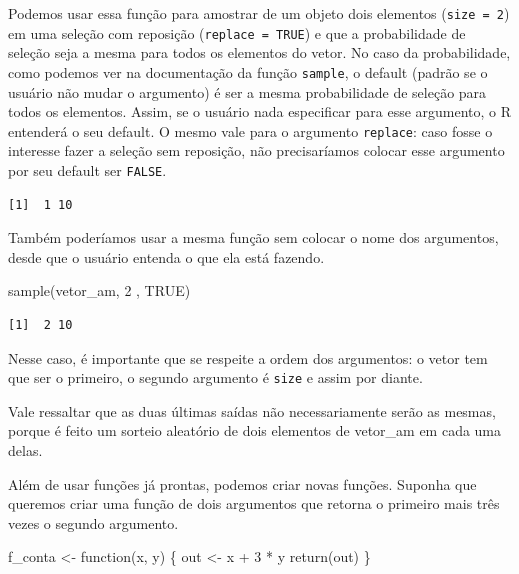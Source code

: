 \documentclass[
  letterpaper,
  DIV=11,
  numbers=noendperiod]{scrreprt}
\newenvironment{Shaded}{\begin{snugshade}}{\end{snugshade}}
\newcommand{\ConstantTok}[1]{\textcolor[rgb]{0.56,0.35,0.01}{#1}}
\newcommand{\ControlFlowTok}[1]{\textcolor[rgb]{0.00,0.23,0.31}{#1}}
\newcommand{\DecValTok}[1]{\textcolor[rgb]{0.68,0.00,0.00}{#1}}
\newcommand{\FunctionTok}[1]{\textcolor[rgb]{0.28,0.35,0.67}{#1}}
\newcommand{\NormalTok}[1]{\textcolor[rgb]{0.00,0.23,0.31}{#1}}
\newcommand{\OtherTok}[1]{\textcolor[rgb]{0.00,0.23,0.31}{#1}}
\newcommand{\SpecialCharTok}[1]{\textcolor[rgb]{0.37,0.37,0.37}{#1}}
\begin{document}
Podemos usar essa função para amostrar de um objeto dois elementos
(\texttt{size\ =\ 2}) em uma seleção com reposição
(\texttt{replace\ =\ TRUE}) e que a probabilidade de seleção seja a
mesma para todos os elementos do vetor. No caso da probabilidade, como
podemos ver na documentação da função \texttt{sample}, o default (padrão
se o usuário não mudar o argumento) é ser a mesma probabilidade de
seleção para todos os elementos. Assim, se o usuário nada especificar
para esse argumento, o R entenderá o seu default. O mesmo vale para o
argumento \texttt{replace}: caso fosse o interesse fazer a seleção sem
reposição, não precisaríamos colocar esse argumento por seu default ser
\texttt{FALSE}.

\begin{verbatim}
[1]  1 10
\end{verbatim}

Também poderíamos usar a mesma função sem colocar o nome dos argumentos,
desde que o usuário entenda o que ela está fazendo.

\begin{Shaded}
\begin{Highlighting}[]
\FunctionTok{sample}\NormalTok{(vetor\_am, }\DecValTok{2}\NormalTok{ , }\ConstantTok{TRUE}\NormalTok{) }
\end{Highlighting}
\end{Shaded}

\begin{verbatim}
[1]  2 10
\end{verbatim}

Nesse caso, é importante que se respeite a ordem dos argumentos: o vetor
tem que ser o primeiro, o segundo argumento é \texttt{size} e assim por
diante.

Vale ressaltar que as duas últimas saídas não necessariamente serão as
mesmas, porque é feito um sorteio aleatório de dois elementos de
vetor\_am em cada uma delas.

Além de usar funções já prontas, podemos criar novas funções. Suponha
que queremos criar uma função de dois argumentos que retorna o primeiro
mais três vezes o segundo argumento.

\begin{Shaded}
\begin{Highlighting}[]
\NormalTok{f\_conta }\OtherTok{\textless{}{-}} \ControlFlowTok{function}\NormalTok{(x, y) \{}
\NormalTok{  out }\OtherTok{\textless{}{-}}\NormalTok{ x }\SpecialCharTok{+} \DecValTok{3} \SpecialCharTok{*}\NormalTok{ y}
  \FunctionTok{return}\NormalTok{(out)}
\NormalTok{\}}
\end{Highlighting}
\end{Shaded}
\end{document}
